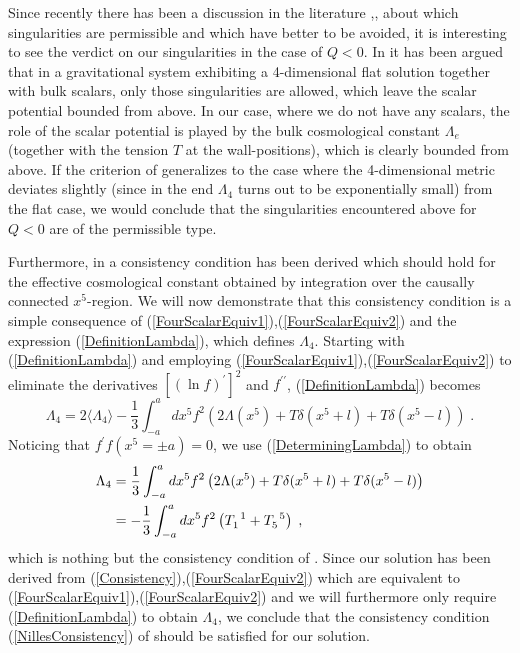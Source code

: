 \documentclass[a4paper,12pt]{article}
\begin{document}
Since recently there has been a discussion in the literature
\cite{Gubser},\cite{FLLN1},\cite{FLLN2} about which singularities are
permissible and which
have better to be avoided, it is interesting to see the verdict on our
singularities in the case of $Q<0$. In
\cite{Gubser} it has been argued that in a gravitational system exhibiting a
4-dimensional flat solution together with bulk scalars, only those
singularities are allowed, which leave the scalar potential bounded
from above. In our case, where we do not have any scalars, the role of
the scalar potential is played by the bulk cosmological constant
$\Lambda_e$ (together with the tension $T$ at the wall-positions),
which is clearly bounded from above.  If the criterion of
\cite{Gubser} generalizes to the case where the 4-dimensional metric
deviates slightly (since in the end $\Lambda_4$ turns out to be
exponentially small) from the flat case, we would conclude that the
singularities encountered above for $Q<0$ are of the permissible type.

Furthermore, in \cite{FLLN2} a consistency condition has been derived which
should hold for the effective cosmological constant obtained by integration
over the causally connected $x^5$-region. We will now demonstrate that this
consistency condition is a simple consequence of
(\ref{FourScalarEquiv1}),(\ref{FourScalarEquiv2}) and the expression
(\ref{DefinitionLambda}), which defines $\Lambda_4$. Starting with
(\ref{DefinitionLambda}) and employing
(\ref{FourScalarEquiv1}),(\ref{FourScalarEquiv2}) to eliminate the derivatives
$[(\ln f)^\prime]^2$ and $f^{\prime\prime}$, (\ref{DefinitionLambda}) becomes
\begin{equation}
  \Lambda_4 = 2\langle \Lambda_4 \rangle
             -\frac{1}{3}\int_{-a}^a dx^5 f^2 \left( 2\Lambda(x^5)
             +T\delta(x^5+l)+T\delta(x^5-l)\right) \; .
\end{equation}  
Noticing that $f^\prime f(x^5=\pm a)=0$, we use (\ref{DeterminingLambda}) to
obtain
\begin{alignat}{3}
  \Lambda_4 &= \frac{1}{3}\int_{-a}^a dx^5 f^2 \left( 2\Lambda(x^5)
              +T\delta(x^5+l)+T\delta(x^5-l)\right) \notag \\
            &= -\frac{1}{3}\int_{-a}^a dx^5 f^2 
               \left( T_1^{\phantom{1}1}+T_5^{\phantom{5}5} \right) \; ,
  \label{NillesConsistency}
\end{alignat}
which is nothing but the consistency condition of \cite{FLLN2}. Since
our solution has been derived from
(\ref{Consistency}),(\ref{FourScalarEquiv2}) which are equivalent to
(\ref{FourScalarEquiv1}),(\ref{FourScalarEquiv2}) and we will furthermore only
require
(\ref{DefinitionLambda}) to obtain $\Lambda_4$, we conclude that the
consistency condition (\ref{NillesConsistency}) of \cite{FLLN2} should be
satisfied for our solution.
\end{document}
